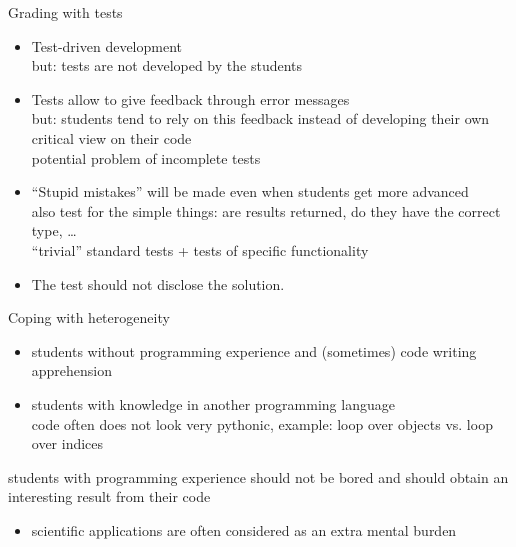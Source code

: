 \documentclass[svgnames]{beamer}
\begin{document}
\begin{frame}{Grading with tests}
 \begin{itemize}
  \item Test-driven development\\
	but: tests are not developed by the students
  \item Tests allow to give feedback through error messages\\
	but: students tend to rely on this feedback instead of developing their own critical view on their code\\
	potential problem of incomplete tests
  \item ``Stupid mistakes'' will be made even when students get more advanced\\
	also test for the simple things: are results returned, do they have the correct type, \dots\\
	``trivial'' standard tests + tests of specific functionality
  \item The test should not disclose the solution.
 \end{itemize}
\end{frame}

\begin{frame}{Coping with heterogeneity}
 \begin{itemize}
  \item students without programming experience and (sometimes) code writing apprehension
  \item students with knowledge in another programming language\\
	code often does not look very pythonic, example: loop over objects vs. loop over indices
 \end{itemize}

 students with programming experience should not be bored and should obtain an interesting result from their code

 \begin{itemize}
  \item scientific applications are often considered as an extra mental burden
 \end{itemize}
\end{frame}
\end{document}
